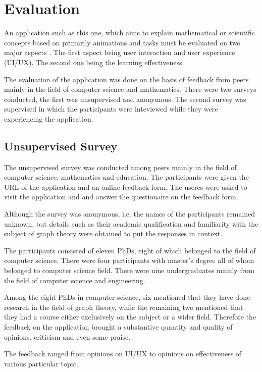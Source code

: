 
\section{Evaluation}

An application such as this one, which aims to explain mathematical or
scientific concepts based on primarily animations and tasks must be evaluated
on two major aspects . The first aspect being user interaction and user
experience (UI/UX). The second one being the learning effectiveness.


The evaluation of the application was done on the basis of feedback from peers
mainly in the field of computer science and mathematics. There were two surveys
conducted, the first was unsupervised and anonymous. The second survey was
supervised in which the participants were inteviewed while they were
experiencing the application.

\subsection{Unsupervised Survey}
The unsupervised survey was conducted among peers mainly in the field of
computer science, mathematics and education. The participants were given the
URL of the application and an online feedback form. The useres were asked to
visit the application and and answer the questionaire on the feedback form.

Although the survey was anonymous, i.e. the names of the participants remained
unknown, but details such as their academic qualification and familiarity with
the subject of graph theory were obtained to put the responses in context.

The participants consisted of eleven PhDs, eight of which belonged to the field
of computer science. There were four participants with master's degree all of
whom belonged to computer science field. There were nine undergraduates mainly
from the field of computer science and engineering.

Among the eight PhDs in computer science, six mentioned that they have done
research in the field of graph theory, while the remaining two mentioned that
they had a course either exclusively on the subject or a wider field.
Therefore the feedback on the application brought a substantive quantity and
quality of opinions, criticism and even some praise.

The feedback ranged from opinions on UI/UX to 
opinions on effectiveness of various particular topic.

